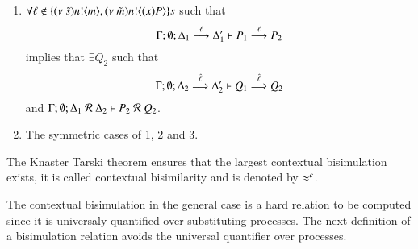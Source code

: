 \begin{definition}
\begin{enumerate}
		\item	$\forall \ell \notin \{(\nu\ \tilde{s}) n ! \langle m \rangle, (\nu\ \tilde{m}) n ! \langle (x)P \rangle\}s$ such that
			\[
				\Gamma; \emptyset; \Delta_1 \stackrel{\ell}{\longrightarrow} \Delta_1' \vdash P_1 \stackrel{\ell}{\longrightarrow} P_2
			\]
			implies that $\exists Q_2$ such that 
			\[
				\Gamma; \emptyset; \Delta_2 \stackrel{\hat{\ell}}{\Longrightarrow} \Delta_2' \vdash Q_1 \stackrel{\hat{\ell}}{\Longrightarrow} Q_2
			\]
			and
			$\Gamma; \emptyset; \Delta_1\ \mathcal{R}\ \Delta_2 \proves P_2\ \mathcal{R}\ Q_2$.

		\item	The symmetric cases of 1, 2 and 3.
	\end{enumerate}
	The Knaster Tarski theorem ensures that the largest contextual bisimulation exists, it is called contextual bisimilarity and is denoted by $\approx^c$.
\end{definition}

The contextual bisimulation in the general case is a hard relation to be computed
since it is universaly quantified over substituting processes. The next definition
of a bisimulation relation avoids the universal quantifier over processes.

\newcommand{\nametrigger}[2]{\binp{#1}{X} \appl{X}{#2}}

